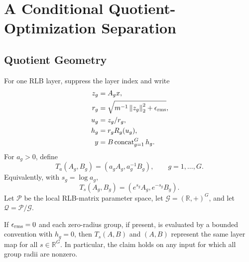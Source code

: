 
\providecommand{\rms}{\operatorname{rms}}
\providecommand{\MP}{\operatorname{MP}}
\providecommand{\AW}{\operatorname{AdamW}}
\providecommand{\R}{\mathbb{R}}
\providecommand{\cG}{\mathcal{G}}
\providecommand{\cQ}{\mathcal{Q}}
\providecommand{\cP}{\mathcal{P}}
\providecommand{\norm}[1]{\left\lVert #1 \right\rVert}
\providecommand{\ip}[2]{\left\langle #1,#2 \right\rangle}
\providecommand{\lammax}{\lambda_{\max}}
\providecommand{\lammin}{\lambda_{\min}}

\section{A Conditional Quotient-Optimization Separation}
\label{app:complete-opt-proof}
\label{app:gauge-conditioning}

\subsection{Quotient Geometry}
\label{app:complete-opt-proof:geometry}

For one RLB layer, suppress the layer index and write
\begin{align}
    z_g &= A_g x, \\
    r_g &= \sqrt{m^{-1}\norm{z_g}_2^2+\epsilon_{\rm rms}}, \\
    u_g &= z_g/r_g, \\
    h_g &= r_g R_g(u_g), \\
    y &= B\operatorname{concat}_{g=1}^G h_g .
\end{align}
For $a_g>0$, define
\begin{equation}
    T_a(A_g,B_g)=(a_gA_g,a_g^{-1}B_g),
    \qquad g=1,\ldots,G .
    \label{eq:complete-positive-action}
\end{equation}
Equivalently, with $s_g=\log a_g$,
\begin{equation}
    T_s(A_g,B_g)=(e^{s_g}A_g,e^{-s_g}B_g).
    \label{eq:complete-log-action}
\end{equation}
Let $\cP$ be the local RLB-matrix parameter space, let $\cG=(\R,+)^G$, and let
$\cQ=\cP/\cG$.

\begin{lemma}
\label{lem:exact-positive-gauge}
If $\epsilon_{\rm rms}=0$ and each zero-radius group, if present, is evaluated by a
bounded convention with $h_g=0$, then $T_s(A,B)$ and $(A,B)$ represent the same layer map
for all $s\in\R^G$.  In particular, the claim holds on any input for which all group
radii are nonzero.
\end{lemma}

